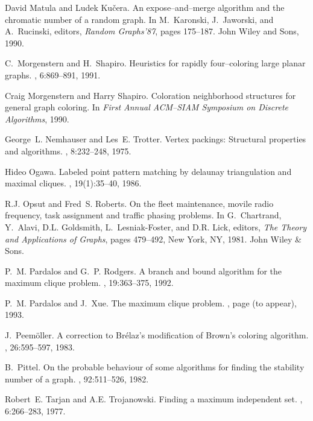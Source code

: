 \begin{thebibliography}{10}
David Matula and Ludek Ku{\v c}era.
\newblock An expose--and--merge algorithm and the chromatic number of a random
  graph.
\newblock In M.~Karonski, J.~Jaworski, and A.~Rucinski, editors, {\em Random
  Graphs'87}, pages 175--187. John Wiley and Sons, 1990.

C.~Morgenstern and H.~Shapiro.
\newblock Heuristics for rapidly four--coloring large planar graphs.
, 6:869--891, 1991.

Craig Morgenstern and Harry Shapiro.
\newblock Coloration neighborhood structures for general graph coloring.
\newblock In {\em First {A}nnual {ACM--SIAM} {S}ymposium on {D}iscrete
  {A}lgorithms}, 1990.

George~L. Nemhauser and Les~E. Trotter.
\newblock Vertex packings: Structural properties and algorithms.
, 8:232--248, 1975.

Hideo Ogawa.
\newblock Labeled point pattern matching by delaunay triangulation and maximal
  cliques.
, 19(1):35--40, 1986.

R.J. Opsut and Fred~S. Roberts.
\newblock On the fleet maintenance, movile radio frequency, task assignment and
  traffic phasing problems.
\newblock In G.~Chartrand, Y.~Alavi, D.L. Goldsmith, L.~Lesniak-Foster, and
  D.R. Lick, editors, {\em The Theory and Applications of Graphs}, pages
  479--492, New York, NY, 1981. John Wiley \& Sons.

P.~M. Pardalos and G.~P. Rodgers.
\newblock A branch and bound algorithm for the maximum clique problem.
, 19:363--375, 1992.

P.~M. Pardalos and J.~Xue.
\newblock The maximum clique problem.
, page (to appear), 1993.

J.~Peem\"{o}ller.
\newblock A correction to {B}r\'elaz's modification of {B}rown's coloring
  algorithm.
, 26:595--597, 1983.

B.~Pittel.
\newblock On the probable behaviour of some algorithms for finding the
  stability number of a graph.
,
  92:511--526, 1982.

Robert~E. Tarjan and A.E. Trojanowski.
\newblock Finding a maximum independent set.
, 6:266--283, 1977.


\end{thebibliography}

